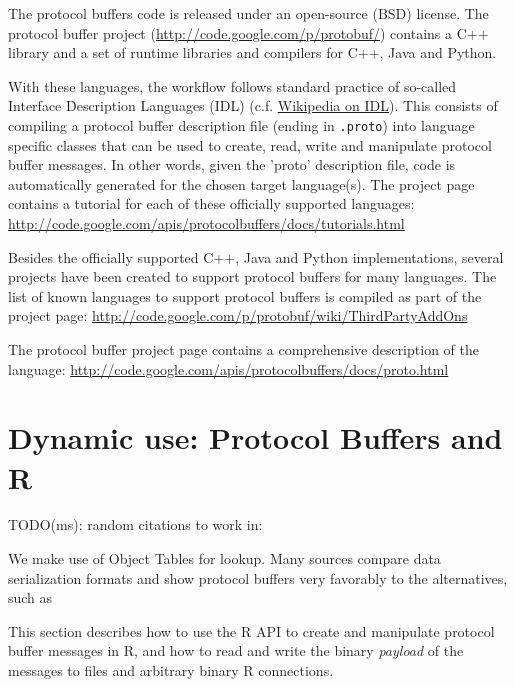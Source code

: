 The protocol buffers code is released under an open-source (BSD) license. The
protocol buffer project (\url{http://code.google.com/p/protobuf/})
contains a C++ library and a set of runtime libraries and compilers for
C++, Java and Python.

With these languages, the workflow follows standard practice of so-called
Interface Description Languages (IDL)
(c.f. \href{http://en.wikipedia.org/wiki/Interface_description_language}{Wikipedia
  on IDL}).  This consists of compiling a protocol buffer description file
(ending in \texttt{.proto}) into language specific classes that can be used
to create, read, write and manipulate protocol buffer messages. In other
words, given the 'proto' description file, code is automatically generated
for the chosen target language(s). The project page contains a tutorial for
each of these officially supported languages:
\url{http://code.google.com/apis/protocolbuffers/docs/tutorials.html}

Besides the officially supported C++, Java and Python implementations, several projects have been
created to support protocol buffers for many languages. The list of known
languages to support protocol buffers is compiled as part of the
project page: \url{http://code.google.com/p/protobuf/wiki/ThirdPartyAddOns}

The protocol buffer project page contains a comprehensive
description of the language: \url{http://code.google.com/apis/protocolbuffers/docs/proto.html}

%

\section{Dynamic use: Protocol Buffers and R}

TODO(ms): random citations to work in:

We make use of Object Tables \citep{RObjectTables} for lookup.
Many sources compare data serialization formats and show protocol
buffers very favorably to the alternatives, such
as \citep{Sumaray:2012:CDS:2184751.2184810}

This section describes how to use the R API to create and manipulate
protocol buffer messages in R, and how to read and write the
binary \emph{payload} of the messages to files and arbitrary binary
R connections.


